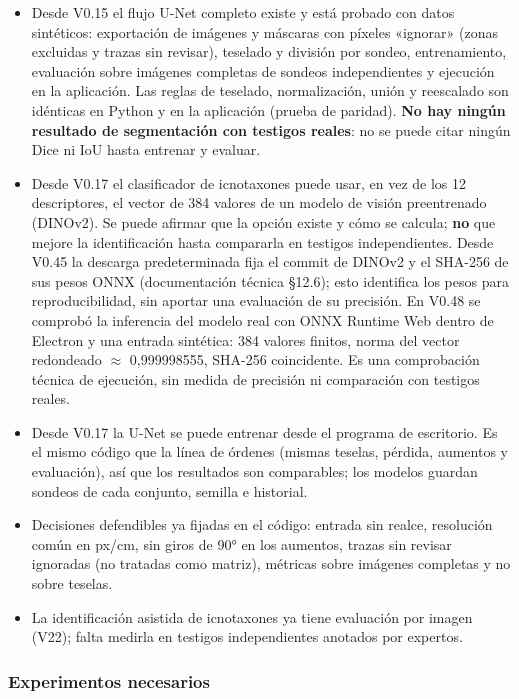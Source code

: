 \documentclass[
  10pt,
]{article}
\begin{document}
\begin{itemize}
\item
  Desde V0.15 el flujo U-Net completo existe y está probado con datos
  sintéticos: exportación de imágenes y máscaras con píxeles «ignorar»
  (zonas excluidas y trazas sin revisar), teselado y división por
  sondeo, entrenamiento, evaluación sobre imágenes completas de sondeos
  independientes y ejecución en la aplicación. Las reglas de teselado,
  normalización, unión y reescalado son idénticas en Python y en la
  aplicación (prueba de paridad). \textbf{No hay ningún resultado de
  segmentación con testigos reales}: no se puede citar ningún Dice ni
  IoU hasta entrenar y evaluar.
\item
  Desde V0.17 el clasificador de icnotaxones puede usar, en vez de los
  12 descriptores, el vector de 384 valores de un modelo de visión
  preentrenado (DINOv2). Se puede afirmar que la opción existe y cómo se
  calcula; \textbf{no} que mejore la identificación hasta compararla en
  testigos independientes. Desde V0.45 la descarga predeterminada fija
  el commit de DINOv2 y el SHA-256 de sus pesos ONNX (documentación
  técnica §12.6); esto identifica los pesos para reproducibilidad, sin
  aportar una evaluación de su precisión. En V0.48 se comprobó la
  inferencia del modelo real con ONNX Runtime Web dentro de Electron y
  una entrada sintética: 384 valores finitos, norma del vector
  redondeado $\approx$ 0,999998555, SHA-256 coincidente. Es una comprobación
  técnica de ejecución, sin medida de precisión ni comparación con
  testigos reales.
\item
  Desde V0.17 la U-Net se puede entrenar desde el programa de
  escritorio. Es el mismo código que la línea de órdenes (mismas
  teselas, pérdida, aumentos y evaluación), así que los resultados son
  comparables; los modelos guardan sondeos de cada conjunto, semilla e
  historial.
\item
  Decisiones defendibles ya fijadas en el código: entrada sin realce,
  resolución común en px/cm, sin giros de 90° en los aumentos, trazas
  sin revisar ignoradas (no tratadas como matriz), métricas sobre
  imágenes completas y no sobre teselas.
\item
  La identificación asistida de icnotaxones ya tiene evaluación por
  imagen (V22); falta medirla en testigos independientes anotados por
  expertos.
\end{itemize}

\hypertarget{experimentos-necesarios}{%
\subsubsection{Experimentos necesarios}\label{experimentos-necesarios}}
\end{document}

